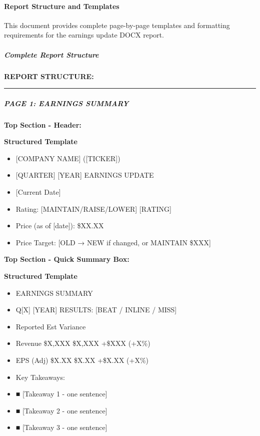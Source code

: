 \documentclass[11pt]{article}
\begin{document}
\paragraph{Report Structure and Templates}\mbox{}\par

This document provides complete page-by-page templates and formatting requirements for the earnings update DOCX report.


\subparagraph{Complete Report Structure}\mbox{}\par

\textbf{REPORT STRUCTURE:}


\vspace{0.5em}\hrule\vspace{0.5em}

\subparagraph{PAGE 1: EARNINGS SUMMARY}\mbox{}\par

\textbf{Top Section - Header:}

\textbf{Structured Template}
\begin{itemize}[leftmargin=*,itemsep=2pt,topsep=2pt]
\item {} [COMPANY NAME] ([TICKER])
\item {} [QUARTER] [YEAR] EARNINGS UPDATE
\item {} [Current Date]
\item {} Rating: [MAINTAIN/RAISE/LOWER] [RATING]
\item {} Price (as of [date]): \$XX.XX
\item {} Price Target: [OLD → NEW if changed, or MAINTAIN \$XXX]
\end{itemize}

\textbf{Top Section - Quick Summary Box:}

\textbf{Structured Template}
\begin{itemize}[leftmargin=*,itemsep=2pt,topsep=2pt]
\item {} EARNINGS SUMMARY
\item {} Q[X] [YEAR] RESULTS: [BEAT / INLINE / MISS]
\item {} Reported Est Variance
\item {} Revenue \$X,XXX \$X,XXX +\$XXX (+X\%)
\item {} EPS (Adj) \$X.XX \$X.XX +\$X.XX (+X\%)
\item {} Key Takeaways:
\item {} ■ [Takeaway 1 - one sentence]
\item {} ■ [Takeaway 2 - one sentence]
\item {} ■ [Takeaway 3 - one sentence]
\end{itemize}
\end{document}
